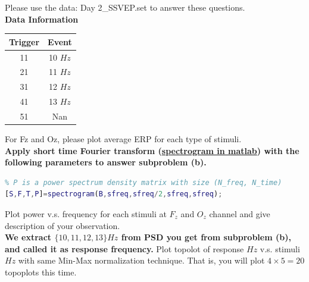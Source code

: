 \documentclass[a4 paper]{article}
\begin{document}
\begin{tcolorbox}[colback=RubineRed!5!white,colframe=RubineRed!75!black]
Please use the data: Day 2\_SSVEP.set to answer these questions.
\\\textbf{Data Information}
\begin{center}
   \begin{tabular}{||c|c||}
    \hline
    Trigger & Event\\
    \hline
     11 & 10 $Hz$ \\
     21 & 11 $Hz$\\
     31 & 12 $Hz$\\
     41 & 13 $Hz$\\
     51 & Nan\\
     \hline
    \end{tabular}
\end{center}
 For Fz and Oz, please plot average ERP for each type of stimuli.
\\\textbf{Apply short time Fourier transform (\href{https://www.mathworks.com/help/signal/ref/spectrogram.html}{spectrogram in matlab}) with the following parameters to answer subproblem (b).} 
\begin{lstlisting}[language=Matlab]
% B: SSVEP for certain channel, sfreq:sampling rate
% P is a power spectrum density matrix with size (N_freq, N_time)
[S,F,T,P]=spectrogram(B,sfreq,sfreq/2,sfreq,sfreq);
\end{lstlisting}
 Plot power v.s. frequency for each stimuli at $F_z$ and $O_z$ channel and give description of your observation.
\\\textbf{We extract $\{10,11,12,13\}Hz$ from PSD you get from subproblem (b), and called it as response frequency.}
 Plot topolot of response $Hz$ v.s. stimuli $Hz$ with same Min-Max normalization technique. That is, you will plot $4\times5=20$ topoplots this time.
\end{tcolorbox}
\end{document}
